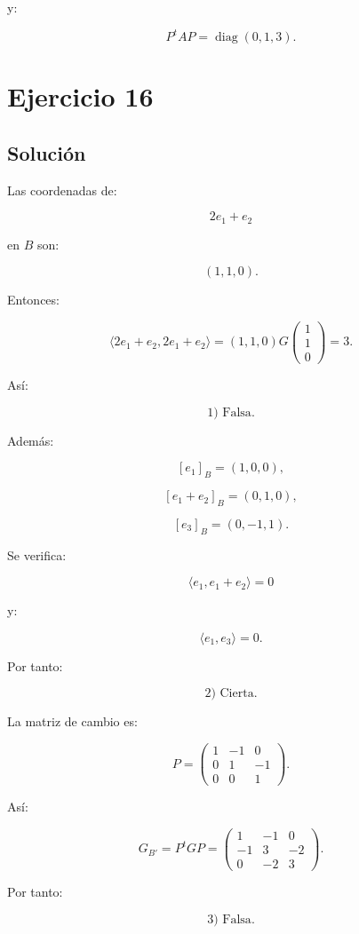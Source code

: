 \documentclass[11pt,a4paper]{article}
\newcommand{\diag}{\operatorname{diag}}
\begin{document}
y:

\[
\boxed{
P^tAP=
\diag(0,1,3).
}
\]

\section{Ejercicio 16}
\subsection{Solución}

Las coordenadas de:

\[
2e_1+e_2
\]

en $B$ son:

\[
(1,1,0).
\]

Entonces:

\[
\langle2e_1+e_2,2e_1+e_2\rangle
=
(1,1,0)
G
\begin{pmatrix}
1\\1\\0
\end{pmatrix}
=3.
\]

Así:

\[
\boxed{\text{1) Falsa}.}
\]

Además:

\[
[e_1]_B=(1,0,0),
\]

\[
[e_1+e_2]_B=(0,1,0),
\]

\[
[e_3]_B=(0,-1,1).
\]

Se verifica:

\[
\langle e_1,e_1+e_2\rangle=0
\]

y:

\[
\langle e_1,e_3\rangle=0.
\]

Por tanto:

\[
\boxed{\text{2) Cierta}.}
\]

La matriz de cambio es:

\[
P=
\begin{pmatrix}
1&-1&0\\
0&1&-1\\
0&0&1
\end{pmatrix}.
\]

Así:

\[
G_{B'}
=
P^tGP
=
\begin{pmatrix}
1&-1&0\\
-1&3&-2\\
0&-2&3
\end{pmatrix}.
\]

Por tanto:

\[
\boxed{\text{3) Falsa}.}
\]
\end{document}
